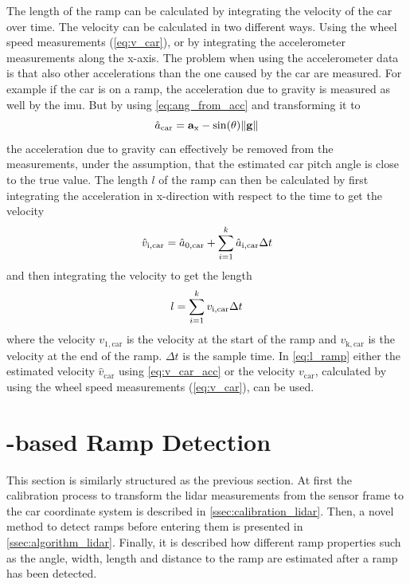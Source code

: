 The length of the ramp can be calculated by integrating the velocity of the car over time.
The velocity can be calculated in two different ways.
Using the wheel speed measurements (\cref{eq:v_car}), or by integrating the accelerometer measurements along the x-axis.
The problem when using the accelerometer data is that also other accelerations than the one caused by the car are measured.
For example if the car is on a ramp, the acceleration due to gravity is measured as well by the \gls{imu}.
But by using \cref{eq:ang_from_acc} and transforming it to
\begin{equation}
    \label{eq:acc_from_imu_wo_grav}
    \hat{a}_\mathrm{car} = \vb{a}_\mathrm{x} - \sin(\theta) \norm{\vb{g}}
\end{equation}
the acceleration due to gravity can effectively be removed from the measurements, under the assumption, that the estimated car pitch angle is close to the true value.
The length $l$ of the ramp can then be calculated by first integrating the acceleration in x-direction with respect to the time to get the velocity
\begin{equation}
    \label{eq:v_car_acc}
    \hat{v}_\mathrm{i, car} = \hat{a}_\mathrm{0, car} + \sum_{i = 1}^k \hat{a}_\mathrm{i, car} \Delta t                         \\
\end{equation}
and then integrating the velocity to get the length
\begin{equation}
    \label{eq:l_ramp}
    l = \sum_{i = 1}^k v_\mathrm{i, car} \Delta t                         \\
\end{equation}
where the velocity $v_\mathrm{1, car}$ is the velocity at the start of the ramp and $v_\mathrm{k, car}$ is the velocity at the end of the ramp.
$\Delta t$ is the sample time.
In \cref{eq:l_ramp} either the estimated velocity $\hat{v}_\mathrm{car}$ using \cref{eq:v_car_acc} or the velocity ${v}_\mathrm{car}$, calculated by using the wheel speed measurements (\cref{eq:v_car}), can be used.



\section{-based Ramp Detection}
\label{sec:methods_lidar}
This section is similarly structured as the previous section.
At first the calibration process to transform the \gls{lidar} measurements from the sensor frame to the car coordinate system is described in \cref{ssec:calibration_lidar}.
Then, a novel method to detect ramps before entering them is presented in \cref{ssec:algorithm_lidar}.
Finally, it is described how different ramp properties such as the angle, width, length and distance to the ramp are estimated after a ramp has been detected.

